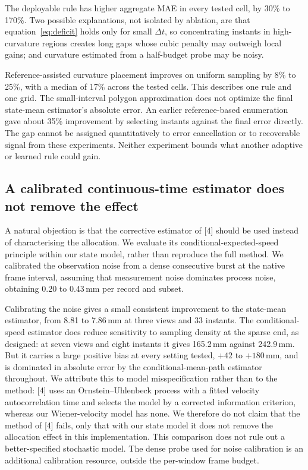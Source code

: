 \documentclass{iopjournal}
\begin{document}
The deployable rule has higher aggregate MAE in every tested cell, by
30\% to 170\%. Two possible explanations, not isolated by ablation, are that equation~\eqref{eq:deficit} holds only for small $\Delta t$, so
concentrating instants in high-curvature regions creates long gaps whose cubic
penalty may outweigh local gains; and curvature estimated from a
half-budget probe may be noisy.

Reference-assisted curvature placement improves on uniform sampling by
8\% to 25\%, with a median of 17\% across the tested cells. This describes
one rule and one grid. The small-interval polygon approximation does not
optimize the final state-mean estimator's absolute error. An earlier
reference-based enumeration gave about 35\% improvement by selecting instants
against the final error directly. The gap cannot be assigned quantitatively
to error cancellation or to recoverable signal from these experiments.
Neither experiment bounds what another adaptive or learned rule could gain.

\subsection{A calibrated continuous-time estimator does not remove the effect}
\label{sec:ctsd}
A natural objection is that the corrective estimator of [4] should be used
instead of characterising the allocation. We evaluate its conditional-expected-speed principle
within our state model, rather than reproduce the full method. We calibrated the
observation noise from a dense consecutive burst at the native frame interval,
assuming that measurement noise dominates process noise, obtaining 0.20 to 0.43\,mm
per record and subset.

Calibrating the noise gives a small consistent improvement to the state-mean
estimator, from 8.81 to 7.86\,mm at three views and 33 instants. The
conditional-speed estimator does reduce sensitivity to sampling density at the
sparse end, as designed: at seven views and eight instants it gives 165.2\,mm
against 242.9\,mm. But it carries a large positive bias at every setting
tested, $+42$ to $+180$\,mm, and is dominated in absolute error by the
conditional-mean-path estimator throughout. We attribute this to model
misspecification rather than to the method: [4] uses an
Ornstein--Uhlenbeck process with a fitted velocity autocorrelation time and
selects the model by a corrected information criterion, whereas our
Wiener-velocity model has none. We therefore do not claim that the method of
[4] fails, only that with our state model it does not remove the allocation
effect in this implementation. This comparison does not rule out a
better-specified stochastic model. The dense probe used for noise calibration
is an additional calibration resource, outside the per-window frame budget.
\end{document}
